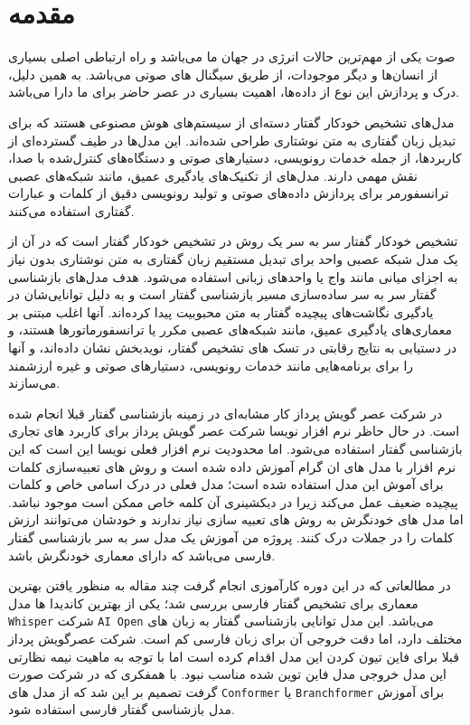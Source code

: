 \chapter{مقدمه}
{
صوت یکی از مهم‌ترین حالات انرژی در جهان ما می‌باشد و راه ارتباطی اصلی بسیاری از انسان‌ها و دیگر موجودات،‌ از طریق سیگنال های صوتی می‌باشد. به همین دلیل، درک و پردازش این نوع از داده‌ها، اهمیت بسیاری در عصر حاضر برای ما دارا می‌باشد. 

مدل‌های تشخیص خودکار گفتار  دسته‌ای از سیستم‌های هوش مصنوعی هستند که برای تبدیل زبان گفتاری به متن نوشتاری طراحی شده‌اند. این مدل‌ها در طیف گسترده‌ای از کاربردها، از جمله خدمات رونویسی، دستیارهای صوتی و دستگاه‌های کنترل‌شده با صدا، نقش مهمی دارند. مدل‌های  از تکنیک‌های یادگیری عمیق، مانند شبکه‌های عصبی ترانسفورمر برای پردازش داده‌های صوتی و تولید رونویسی دقیق از کلمات و عبارات گفتاری استفاده می‌کنند.

تشخیص خودکار گفتار سر به سر 
یک روش در تشخیص خودکار گفتار است که در آن از یک مدل شبکه عصبی واحد برای تبدیل مستقیم زبان گفتاری به متن نوشتاری بدون نیاز به اجزای میانی مانند واج یا واحدهای زبانی استفاده می‌شود. هدف مدل‌های بازشناسی گفتار سر به سر ساده‌سازی مسیر بازشناسی گفتار است و به دلیل توانایی‌شان در یادگیری نگاشت‌های پیچیده گفتار به متن محبوبیت پیدا کرده‌اند. آنها اغلب مبتنی بر معماری‌های یادگیری عمیق، مانند شبکه‌های عصبی مکرر  یا ترانسفورماتورها هستند، و در دستیابی به نتایج رقابتی در تسک های تشخیص گفتار، نویدبخش نشان داده‌اند، و آنها را برای برنامه‌هایی مانند خدمات رونویسی، دستیارهای صوتی و غیره ارزشمند می‌سازند.

در شرکت عصر گویش پرداز کار مشابه‌ای در زمینه بازشناسی گفتار قبلا انجام شده است. در حال حاظر نرم افزار نویسا شرکت عصر گویش پرداز برای کاربرد های تجاری بازشناسی گفتار استفاده می‌شود. اما محدودیت نرم افزار فعلی نویسا این است که این نرم افزار با مدل های ان گرام آموزش داده شده است و روش های
تعبیه‌سازی کلمات
برای آموش این مدل استفاده شده است؛ مدل فعلی در درک اسامی خاص و کلمات پیچیده ضعیف عمل می‌کند زیرا در دیکشینری آن کلمه خاص ممکن است موجود نباشد. اما مدل های 
خودنگرش
به روش های تعبیه سازی نیاز ندارند و خودشان می‌توانند ارزش کلمات را در جملات درک کنند. پروژه من آموزش یک مدل 
سر به سر بازشناسی گفتار فارسی
می‌باشد که دارای معماری 
خودنگرش
‌باشد.

در مطالعاتی که در این دوره کارآموزی انجام گرفت چند مقاله به منظور یافتن بهترین معماری برای تشخیص گفتار فارسی بررسی شد؛ یکی از بهترین کاندیدا ها مدل \texttt{Whisper} شرکت \texttt{AI Open} می‌باشد. این مدل توانایی بازشناسی گفتار به زبان های مختلف دارد، اما دقت خروجی آن برای زبان فارسی کم است. شرکت عصرگویش پرداز قبلا برای فاین تیون کردن این مدل اقدام کرده است اما با توجه به ماهیت 
نیمه نظارتی 
این مدل خروجی مدل فاین توین شده مناسب نبود. با همفکری که در شرکت صورت گرفت تصمیم بر این شد که از مدل های \texttt{Conformer} یا \texttt{Branchformer} برای آموزش مدل بازشناسی گفتار فارسی استفاده شود.

}
